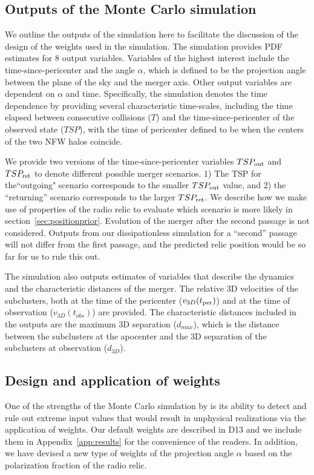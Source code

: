 \documentclass[ucdthesis.tex]{subfiles}
\begin{document}
    \subsection{Outputs of the Monte Carlo simulation}\label{sec:outputs}
    We outline the outputs of the simulation here to facilitate the discussion
    of the design of the weights used in the simulation. The simulation
    provides PDF estimates for 8 output variables. Variables
    of the highest interest include the time-since-pericenter and the angle $\alpha$, which is
    defined to be the projection angle between the plane of the sky and the
    merger axis. Other output variables are dependent on $\alpha$ and time. Specifically, the simulation denotes the time dependence by
    providing several characteristic time-scales, including the time
    elapsed between consecutive collisions
    ($T$) and the time-since-pericenter of the observed state ($TSP$), with the
    time of pericenter defined to be when the centers of the two NFW halos coincide. 
    \par
    We provide two versions of the time-since-pericenter variables $TSP_{\rm out}$ and
    $TSP_{\rm ret}$ to denote different possible merger scenarios. 
    1) The TSP for the``outgoing" scenario corresponds to the
    smaller $TSP_{\rm out}$ value, and 2) the ``returning'' scenario 
    corresponds to the larger $TSP_{\rm ret}$.
    We describe how we make use of properties of the radio relic to evaluate
    which scenario is more likely in
    section~\ref{sec:positionprior}. Evolution of the merger after the second
    passage is not considered. Outputs from our dissipationless simulation for
    a ``second'' passage will not differ from the first passage, and the
    predicted relic position would be so far for us to rule this out.
     
    The simulation also outputs estimates of variables that describe
    the dynamics and the characteristic distances of the merger. The relative
    3D velocities of the subclusters, both at the time of the
    pericenter ($v_{3D}(t_{\rm per})$) and at the time of observation
    ($v_{3D}(t_{obs})$) are provided. The characteristic
    distances included in the outputs are the maximum 3D separation ($d_{max}$),
    which is the distance between the subclusters at
    the apocenter and the 3D separation of the subclusters at observation
    ($d_{3D}$). 
    \subsection{Design and application of weights} 
    \label{sec:priors}
    One of the strengths of the Monte Carlo simulation by
     is its ability to detect and rule out extreme input values that would result in
    unphysical realizations via the application of weights. 
    Our default weights are described in D13 and we include them in
    Appendix~\ref{app:results} for the convenience of the readers. 
    In addition, we have devised a new type of weights of the projection angle $\alpha$
    based on the polarization fraction of the radio relic.
    
\end{document}
